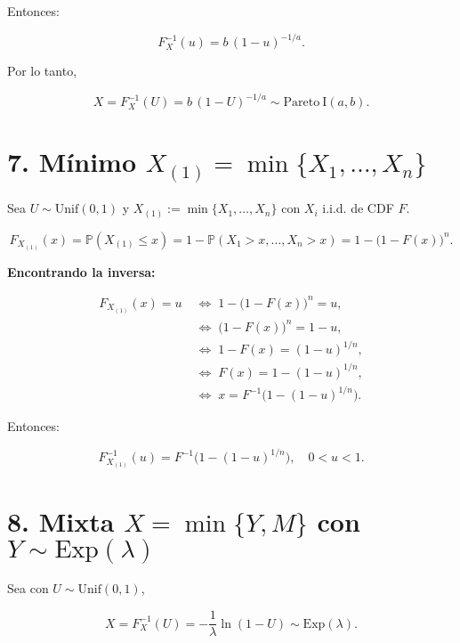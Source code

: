 \documentclass[10pt,a4paper]{article}
\begin{document}
Entonces:

\[
F_X^{-1}(u)=b\,(1-u)^{-1/a}.
\]

Por lo tanto,

\[
X=F_X^{-1}(U)=b\,(1-U)^{-1/a}\sim\mathrm{Pareto\ I}(a,b).
\]

    \hypertarget{muxednimo-x_1minx_1dotsx_n}{%
\section{\texorpdfstring{7. Mínimo
\(X_{(1)}=\min\{X_1,\dots,X_n\}\)}{7. Mínimo X\_\{(1)\}=\textbackslash min\textbackslash\{X\_1,\textbackslash dots,X\_n\textbackslash\}}}\label{muxednimo-x_1minx_1dotsx_n}}

    Sea \textbf{\(U\sim\mathrm{Unif}(0,1)\)} y
\(X_{(1)}:=\min\{X_1,\dots,X_n\}\) con \(X_i\) i.i.d. de CDF \(F\).

\[
F_{X_{(1)}}(x)=\mathbb P(X_{(1)}\le x)
=1-\mathbb P(X_1>x,\dots,X_n>x)
=1-\bigl(1-F(x)\bigr)^n.
\]

\textbf{Encontrando la inversa:}

\[
\begin{aligned}
F_{X_{(1)}}(x)=u 
&\;\iff\; 1-\bigl(1-F(x)\bigr)^n=u,\\
&\;\iff\; \bigl(1-F(x)\bigr)^n=1-u,\\
&\;\iff\; 1-F(x)=(1-u)^{1/n},\\
&\;\iff\; F(x)=1-(1-u)^{1/n},\\
&\;\iff\; x=F^{-1}\!\bigl(1-(1-u)^{1/n}\bigr).
\end{aligned}
\]

Entonces:

\[
F_{X_{(1)}}^{-1}(u)=F^{-1}\!\bigl(1-(1-u)^{1/n}\bigr),\quad 0<u<1.
\]

    \hypertarget{mixta-xminym-con-ysimmathrmexplambda}{%
\section{\texorpdfstring{8. Mixta \(X=\min\{Y,M\}\) con
\(Y\sim\mathrm{Exp}(\lambda)\)}{8. Mixta X=\textbackslash min\textbackslash\{Y,M\textbackslash\} con Y\textbackslash sim\textbackslash mathrm\{Exp\}(\textbackslash lambda)}}\label{mixta-xminym-con-ysimmathrmexplambda}}

    Sea con \(U\sim\mathrm{Unif}(0,1)\),

\[
X=F_X^{-1}(U)=-\frac{1}{\lambda}\ln(1-U)\sim\mathrm{Exp}(\lambda).
\]
\end{document}
